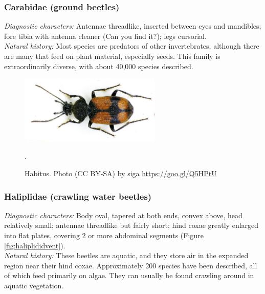 \documentclass[letterpaper, 11pt]{article}
\begin{document}
\subsubsection{Carabidae (ground beetles)} 
\noindent{}\textit{Diagnostic characters:} Antennae threadlike, inserted between eyes and mandibles; fore tibia with antenna cleaner (Can you find it?); legs cursorial.\\

\noindent{}\textit{Natural history:} Most species are predators of other invertebrates, although there are many that feed on plant material, especially seeds. This family is extraordinarily diverse, with about 40,000 species described.
 

\begin{figure}[ht!]
  \centering
    \includegraphics[width=0.6\textwidth]{CarabidHabitus}
  \caption{Habitus. Photo (CC BY-SA) by siga \url{https://goo.gl/Q5HPtU}}.
  \label{fig:carab2}
\end{figure}

\subsubsection{Haliplidae (crawling water beetles)}
\noindent{}\textit{Diagnostic characters:} Body oval, tapered at both ends, convex above, head relatively small; antennae threadlike but fairly short; hind coxae greatly enlarged into flat plates, covering 2 or more abdominal segments (Figure \ref{fig:haliplididvent}).\\

\noindent{}\textit{Natural history:} These beetles are aquatic, and they store air in the expanded region near their hind coxae. Approximately 200 species have been described, all of which feed primarily on algae. They can usually be found crawling around in aquatic vegetation.
\end{document}
